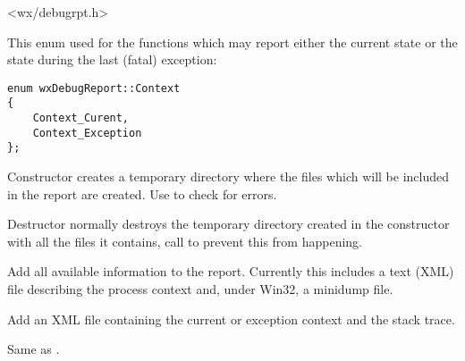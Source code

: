 <wx/debugrpt.h>


This enum used for the functions which may report either the current state
or the state during the last (fatal) exception:
\begin{verbatim}
enum wxDebugReport::Context
{
    Context_Curent,
    Context_Exception
};
\end{verbatim}



\label{wxdebugreportwxdebugreport}


Constructor creates a temporary directory where the files which will
be included in the report are created. Use 
 to check for errors.


\label{wxdebugreportdtor}


Destructor normally destroys the temporary directory created in the constructor
with all the files it contains, call  to
prevent this from happening.


\label{wxdebugreportaddall}


Add all available information to the report. Currently this includes a
text (XML) file describing the process context and, under Win32, a minidump
file.


\label{wxdebugreportaddcontext}


Add an XML file containing the current or exception context and the
stack trace.


\label{wxdebugreportaddcurrentcontext}


Same as .


\label{wxdebugreportaddcurrentdump}


